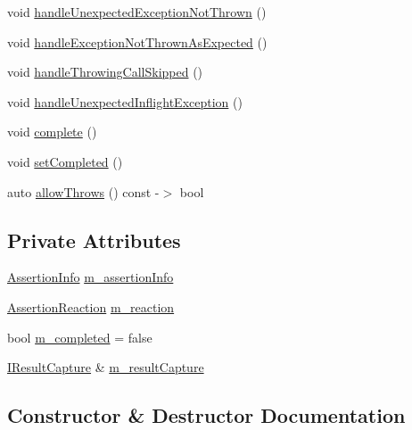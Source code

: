 \begin{DoxyCompactItemize}
void \mbox{\hyperlink{class_catch_1_1_assertion_handler_a7764d0adb6ed5eeb10964f6abc02fab1}{handle\+Unexpected\+Exception\+Not\+Thrown}} ()
\item 
void \mbox{\hyperlink{class_catch_1_1_assertion_handler_a51e4936e3af43b74690cedae6d2e297a}{handle\+Exception\+Not\+Thrown\+As\+Expected}} ()
\item 
void \mbox{\hyperlink{class_catch_1_1_assertion_handler_a67a194d5518f307c4a16faa03a7f7442}{handle\+Throwing\+Call\+Skipped}} ()
\item 
void \mbox{\hyperlink{class_catch_1_1_assertion_handler_aa2504dad6a91f3645e5f52c932c11270}{handle\+Unexpected\+Inflight\+Exception}} ()
\item 
void \mbox{\hyperlink{class_catch_1_1_assertion_handler_a878a9eb828d8a1863c8dcb6575f6f40e}{complete}} ()
\item 
void \mbox{\hyperlink{class_catch_1_1_assertion_handler_a6756bd5395c0ddd28764a9fb4612d5e4}{set\+Completed}} ()
\item 
auto \mbox{\hyperlink{class_catch_1_1_assertion_handler_a193bb3999494c46457f3059184c6b251}{allow\+Throws}} () const -\/$>$ bool
\end{DoxyCompactItemize}
\subsection*{Private Attributes}
\begin{DoxyCompactItemize}
\item 
\mbox{\hyperlink{struct_catch_1_1_assertion_info}{Assertion\+Info}} \mbox{\hyperlink{class_catch_1_1_assertion_handler_ad171e8724bb771d97949b7270f400303}{m\+\_\+assertion\+Info}}
\item 
\mbox{\hyperlink{struct_catch_1_1_assertion_reaction}{Assertion\+Reaction}} \mbox{\hyperlink{class_catch_1_1_assertion_handler_a8203c08a43a3761b5f400ee6587fad55}{m\+\_\+reaction}}
\item 
bool \mbox{\hyperlink{class_catch_1_1_assertion_handler_a5a756818dff781c155e8eb970d1d4c68}{m\+\_\+completed}} = false
\item 
\mbox{\hyperlink{struct_catch_1_1_i_result_capture}{I\+Result\+Capture}} \& \mbox{\hyperlink{class_catch_1_1_assertion_handler_aea5283ee36124ce5c51dc2a697b22a39}{m\+\_\+result\+Capture}}
\end{DoxyCompactItemize}


\subsection{Constructor \& Destructor Documentation}
\mbox{\label{class_catch_1_1_assertion_handler_a32efbb1b56b71d758d4c2094bac1f1a9}} 
